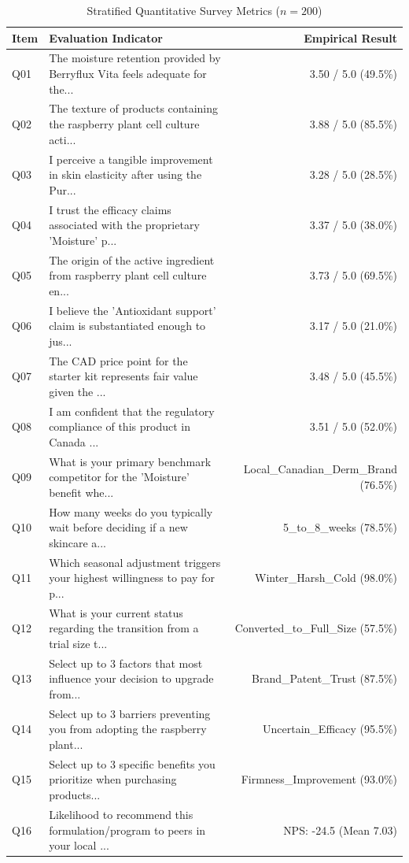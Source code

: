 \documentclass[10pt,twocolumn,a4paper]{article}
\begin{document}
\begin{table}[t]
\centering
\caption{Stratified Quantitative Survey Metrics ($n = 200$)}
\label{tab:metrics}
\small
\begin{tabularx}{\textwidth}{l X r}
\toprule
\textbf{Item} & \textbf{Evaluation Indicator} & \textbf{Empirical Result} \\
\midrule
Q01 & The moisture retention provided by Berryflux Vita feels adequate for the... & 3.50 / 5.0 (49.5\%) \\
Q02 & The texture of products containing the raspberry plant cell culture acti... & 3.88 / 5.0 (85.5\%) \\
Q03 & I perceive a tangible improvement in skin elasticity after using the Pur... & 3.28 / 5.0 (28.5\%) \\
Q04 & I trust the efficacy claims associated with the proprietary 'Moisture' p... & 3.37 / 5.0 (38.0\%) \\
Q05 & The origin of the active ingredient from raspberry plant cell culture en... & 3.73 / 5.0 (69.5\%) \\
Q06 & I believe the 'Antioxidant support' claim is substantiated enough to jus... & 3.17 / 5.0 (21.0\%) \\
Q07 & The CAD price point for the starter kit represents fair value given the ... & 3.48 / 5.0 (45.5\%) \\
Q08 & I am confident that the regulatory compliance of this product in Canada ... & 3.51 / 5.0 (52.0\%) \\
Q09 & What is your primary benchmark competitor for the 'Moisture' benefit whe... & Local\_Canadian\_Derm\_Brand (76.5\%) \\
Q10 & How many weeks do you typically wait before deciding if a new skincare a... & 5\_to\_8\_weeks (78.5\%) \\
Q11 & Which seasonal adjustment triggers your highest willingness to pay for p... & Winter\_Harsh\_Cold (98.0\%) \\
Q12 & What is your current status regarding the transition from a trial size t... & Converted\_to\_Full\_Size (57.5\%) \\
Q13 & Select up to 3 factors that most influence your decision to upgrade from... & Brand\_Patent\_Trust (87.5\%) \\
Q14 & Select up to 3 barriers preventing you from adopting the raspberry plant... & Uncertain\_Efficacy (95.5\%) \\
Q15 & Select up to 3 specific benefits you prioritize when purchasing products... & Firmness\_Improvement (93.0\%) \\
Q16 & Likelihood to recommend this formulation/program to peers in your local ... & NPS: -24.5 (Mean 7.03) \\
\bottomrule
\end{tabularx}
\end{table}
\end{document}
